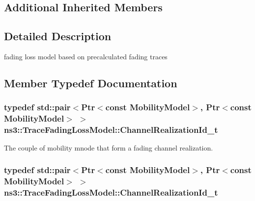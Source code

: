 \subsection*{Additional Inherited Members}


\subsection{Detailed Description}
fading loss model based on precalculated fading traces 

\subsection{Member Typedef Documentation}
\subsubsection[{\texorpdfstring{Channel\+Realization\+Id\+\_\+t}{ChannelRealizationId_t}}]{\setlength{\rightskip}{0pt plus 5cm}typedef std\+::pair$<${\bf Ptr}$<$const {\bf Mobility\+Model}$>$, {\bf Ptr}$<$const {\bf Mobility\+Model}$>$ $>$ {\bf ns3\+::\+Trace\+Fading\+Loss\+Model\+::\+Channel\+Realization\+Id\+\_\+t}}\hypertarget{classns3_1_1TraceFadingLossModel_a538fb5e148b837e46a2da767346839d4}{}\label{classns3_1_1TraceFadingLossModel_a538fb5e148b837e46a2da767346839d4}


The couple of mobility mnode that form a fading channel realization. 

\subsubsection[{\texorpdfstring{Channel\+Realization\+Id\+\_\+t}{ChannelRealizationId_t}}]{\setlength{\rightskip}{0pt plus 5cm}typedef std\+::pair$<${\bf Ptr}$<$const {\bf Mobility\+Model}$>$, {\bf Ptr}$<$const {\bf Mobility\+Model}$>$ $>$ {\bf ns3\+::\+Trace\+Fading\+Loss\+Model\+::\+Channel\+Realization\+Id\+\_\+t}}\hypertarget{classns3_1_1TraceFadingLossModel_a538fb5e148b837e46a2da767346839d4}{}\label{classns3_1_1TraceFadingLossModel_a538fb5e148b837e46a2da767346839d4}


